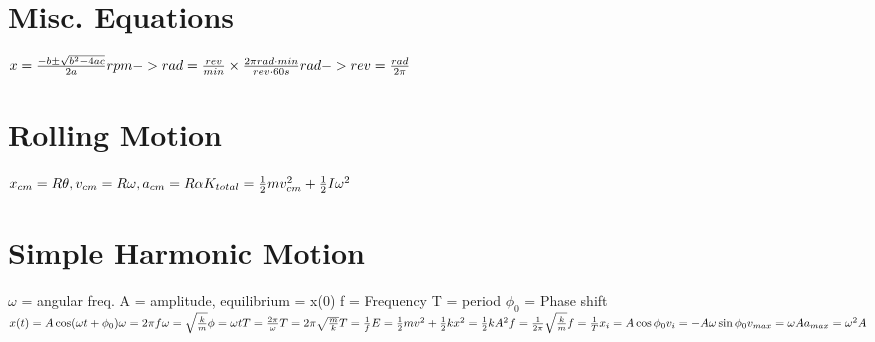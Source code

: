 \documentclass[11pt]{article}
\begin{document}
\begin{paracol}{3}
        \section*{Misc. Equations}
        \begin{fleqn}
            $
            x = \frac{-b \pm \sqrt{b^2-4ac}}{2a} \newline
            rpm -> rad = \frac{rev}{min}\times \frac{2\pi rad \cdot min}{rev \cdot 60s} \newline
            rad -> rev = \frac{rad}{2\pi}
            $
        \end{fleqn}
        \section*{Rolling Motion}
        \begin{fleqn}
            $
            x_{cm} = R\theta, v_{cm} = R\omega, a_{cm} = R\alpha \newline
            K_{total} = \frac12 mv^2_{cm} + \frac12 I \omega^2 \newline
            $
        \end{fleqn}
        \switchcolumn
        \section*{Simple Harmonic Motion}
        \begin{fleqn}
            $\omega$ = angular freq. \newline
            A = amplitude, \newline
            equilibrium  = x(0) \newline
            f = Frequency \newline
            T = period \newline
            $\phi_0$ = Phase shift \newline
            $
            x(t) = A \cos (\omega t + \phi_0) \newline
            \omega = 2\pi f \newline
            \omega = \sqrt{\frac{k}{m}}
            \phi = \omega t \newline
            T = \frac{2 \pi }{ \omega } \newline
            T = 2\pi \sqrt{ \frac{m}{k}} \newline
            T = \frac{1}{f} \newline
            E = \frac12 mv^2 + \frac12 kx^2 = \frac12 kA^2 \newline
            f=\frac{1}{2\pi} \sqrt{\frac{k}{m}} \newline
            f = \frac1{T} \newline
            x_i = A \cos \phi_0 \newline
            v_i = -A \omega \sin \phi_0
            v_{max} = \omega A \newline
            a_{max} = \omega^2 A \newline
            $
        \end{fleqn}
    \end{paracol}
\end{document}
